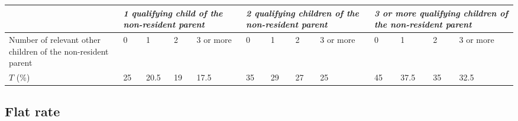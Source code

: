 \documentclass[12pt,a4paper]{article}
\begin{document}
{\scriptsize\noindent{}
\begin{tabular}{p{79pt}p{10pt}p{17pt}p{8pt}p{18pt}p{10pt}p{10pt}p{9pt}p{18pt}p{10pt}p{17pt}p{10pt}p{18pt}}
\hline
&	\multicolumn{4}{p{84pt}}{\itshape 1 qualifying child of the non-resident parent}	& \multicolumn{4}{p{78pt}}{\itshape 2 qualifying children of the non-resident parent}	& \multicolumn{4}{p{84pt}}{\itshape 3 or more qualifying children of the non-resident parent}\\
\hline
Number of relevant other children of the non-resident parent	&0	&1	&2	&3 or more	&0	&1	&2	&3 or more	&0	&1	&2	&3 or more\\
\hline
$T$ (\%)	&25	&20$.$5	&19	&17$.$5	&35	&29	&27	&25	&45	&37$.$5	&35	&32$.$5\\
\hline
\end{tabular}

}

\subsection[4. Flat rate]{Flat rate}
\end{document}
